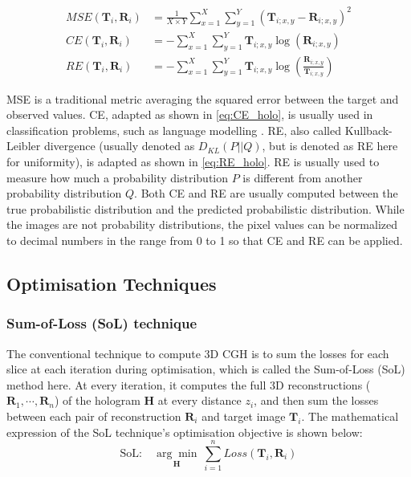 \begin{align}
	MSE(\textbf{T}_i, \textbf{R}_i) & = \frac{1}{X\times Y} \sum_{x=1}^{X} \sum_{y=1}^{Y} (\textbf{T}_{i;x,y}-\textbf{R}_{i;x,y})^2\label{eq:MSE_holo}                     \\
	CE(\textbf{T}_i, \textbf{R}_i)  & = -\sum_{x=1}^{X} \sum_{y=1}^{Y} \textbf{T}_{i;x,y}\log(\textbf{R}_{i;x,y})\label{eq:CE_holo}                                        \\
	RE(\textbf{T}_i, \textbf{R}_i)  & = -\sum_{x=1}^{X} \sum_{y=1}^{Y} \textbf{T}_{i;x,y}\log\left(\frac{\textbf{R}_{i;x,y}}{\textbf{T}_{i;x,y}}\right) \label{eq:RE_holo}
\end{align}

MSE is a traditional metric averaging the squared error between the target and observed values. CE, adapted as shown in \cref{eq:CE_holo}, is usually used in classification problems, such as language modelling \cite{Liu2018}. RE, also called Kullback-Leibler divergence (usually denoted as $D_{KL}(P\vert\vert Q)$, but is denoted as RE here for uniformity), is adapted as shown in \cref{eq:RE_holo}. RE is usually used to measure how much a probability distribution $P$ is different from another probability distribution $Q$. Both CE and RE are usually computed between the true probabilistic distribution and the predicted probabilistic distribution. While the images are not probability distributions, the pixel values can be normalized to decimal numbers in the range from 0 to 1 so that CE and RE can be applied.

\subsection{Optimisation Techniques}
\subsubsection{Sum-of-Loss (SoL) technique}
The conventional technique to compute 3D CGH is to sum the losses for each slice at each iteration during optimisation, which is called the Sum-of-Loss (SoL) method here. At every iteration, it computes the full 3D reconstructions ($\textbf{R}_1, \cdots, \textbf{R}_n$) of the hologram $\textbf{H}$ at every distance $z_i$, and then sum the losses between each pair of reconstruction $\textbf{R}_i$ and target image $\textbf{T}_i$. The mathematical expression of the SoL technique's optimisation objective is shown below:
\begin{equation}
	\text{SoL:}\quad \underset{\textbf{H}}{\arg \min}\ \sum_{i = 1}^{n} Loss(\textbf{T}_i, \textbf{R}_i)
\end{equation}

